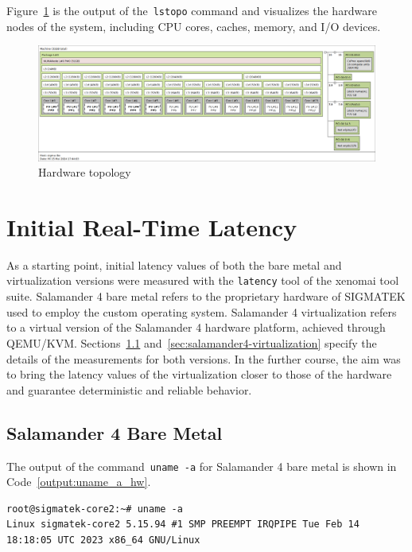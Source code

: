 \documentclass[MMR,Master,english]{twbook}
\begin{document}
\noindent Figure~\ref{fig:lstopo} is the output of the~\texttt{lstopo} command and visualizes the hardware nodes of the system, including CPU cores, caches, memory, and I/O devices.
\begin{figure}[H]
	\centering
	\includegraphics[width=1.0\columnwidth]{img/lstopo.png}
	\caption[Hardware topology]{Hardware topology}
	\label{fig:lstopo}
\end{figure}

\clearpage

\chapter{Initial Real-Time Latency}\label{cha:initial-real-time-latency}

As a starting point, initial latency values of both the bare metal and virtualization versions were measured with the \texttt{latency} tool of the xenomai tool suite. Salamander 4 bare metal refers to the proprietary hardware of SIGMATEK used to employ the custom operating system. Salamander 4 virtualization refers to a virtual version of the Salamander 4 hardware platform, achieved through QEMU/KVM. Sections~\ref{sec:salamander4-bare-metal} and~\ref{sec:salamander4-virtualization} specify the details of the measurements for both versions. In the further course, the aim was to bring the latency values of the virtualization closer to those of the hardware and guarantee deterministic and reliable behavior.

\section{Salamander 4 Bare Metal}\label{sec:salamander4-bare-metal}
The output of the command~\texttt{uname -a} for Salamander 4 bare metal is shown in Code~\ref{output:uname_a_hw}.

\vspace{1em}
\begin{minipage}{0.95\columnwidth}
	\begin{lstlisting}[name={Salamander 4 bare metal system information},label={output:uname_a_hw}]
root@sigmatek-core2:~# uname -a 
Linux sigmatek-core2 5.15.94 #1 SMP PREEMPT IRQPIPE Tue Feb 14 18:18:05 UTC 2023 x86_64 GNU/Linux
\end{lstlisting}
\end{minipage}
\end{document}
